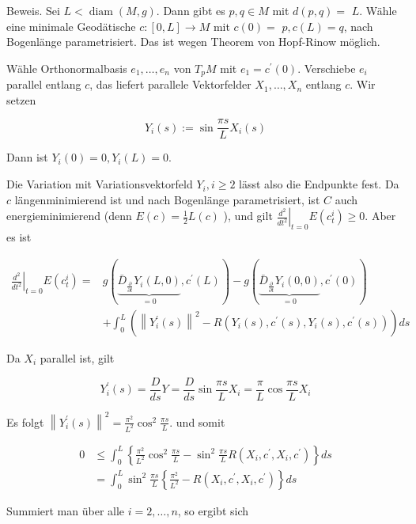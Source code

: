 \documentclass[10pt]{article}
\begin{document}
Beweis. Sei $L<\operatorname{diam}(M, g)$. Dann gibt es $p, q \in M$ mit $d(p, q)=$ $L$. Wähle eine minimale Geodätische $c:[0, L] \rightarrow M$ mit $c(0)=$ $p, c(L)=q$, nach Bogenlänge parametrisiert. Das ist wegen Theorem von Hopf-Rinow möglich.

Wähle Orthonormalbasis $e_{1}, \ldots, e_{n}$ von $T_{p} M$ mit $e_{1}=c^{\prime}(0)$. Verschiebe $e_{i}$ parallel entlang $c$, das liefert parallele Vektorfelder $X_{1}, \ldots, X_{n}$ entlang $c$. Wir setzen

$$
Y_{i}(s):=\sin \frac{\pi s}{L} X_{i}(s)
$$

Dann ist $Y_{i}(0)=0, Y_{i}(L)=0$.

Die Variation mit Variationsvektorfeld $Y_{i}, i \geq 2$ lässt also die Endpunkte fest. Da $c$ längenminimierend ist und nach Bogenlänge parametrisiert, ist $C$ auch energieminimierend (denn $E(c)=\frac{1}{2} L(c)$ ), und gilt $\left.\frac{d^{2}}{d t^{2}}\right|_{t=0} E\left(c_{t}^{i}\right) \geq 0$. Aber es ist

$$
\begin{aligned}
\left.\frac{d^{2}}{d t^{2}}\right|_{t=0} E\left(c_{t}^{i}\right)= & g(\underbrace{\bar{D}_{\frac{\partial}{\partial t}} Y_{i}(L, 0)}_{=0}, c^{\prime}(L))-g(\underbrace{\bar{D}_{\frac{\partial}{\partial t}} Y_{i}(0,0)}_{=0}, c^{\prime}(0)) \\
& +\int_{0}^{L}\left(\left\|Y_{i}^{\prime}(s)\right\|^{2}-R\left(Y_{i}(s), c^{\prime}(s), Y_{i}(s), c^{\prime}(s)\right)\right) d s
\end{aligned}
$$

Da $X_{i}$ parallel ist, gilt

$$
Y_{i}^{\prime}(s)=\frac{D}{d s} Y=\frac{D}{d s} \sin \frac{\pi s}{L} X_{i}=\frac{\pi}{L} \cos \frac{\pi s}{L} X_{i}
$$

Es folgt $\left\|Y_{i}^{\prime}(s)\right\|^{2}=\frac{\pi^{2}}{L^{2}} \cos ^{2} \frac{\pi s}{L}$. und somit

$$
\begin{aligned}
0 & \leq \int_{0}^{L}\left\{\frac{\pi^{2}}{L^{2}} \cos ^{2} \frac{\pi s}{L}-\sin ^{2} \frac{\pi s}{L} R\left(X_{i}, c^{\prime}, X_{i}, c^{\prime}\right)\right\} d s \\
& =\int_{0}^{L} \sin ^{2} \frac{\pi s}{L}\left\{\frac{\pi^{2}}{L^{2}}-R\left(X_{i}, c^{\prime}, X_{i}, c^{\prime}\right)\right\} d s
\end{aligned}
$$

Summiert man über alle $i=2, \ldots, n$, so ergibt sich
\end{document}
